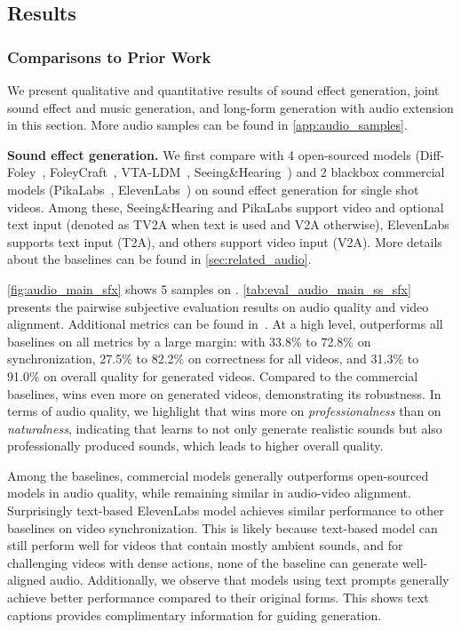 \subsection{Results}

\subsubsection{Comparisons to Prior Work}
\label{sec:main_res}

We present qualitative and quantitative results of sound effect generation, joint sound effect and music generation, and long-form generation with audio extension in this section.
More audio samples can be found in \cref{app:audio_samples}.


\noindent\textbf{Sound effect generation.}
We first compare \OursAudio with 4 open-sourced models (Diff-Foley~\citep{luo2024diff}, FoleyCraft~\citep{zhang2024foleycrafter}, VTA-LDM~\citep{xu2024video}, Seeing\&Hearing~\citep{xing2024seeing}) and 2 blackbox commercial models (PikaLabs~\citep{pikalabs}, ElevenLabs~\citep{elevenlabs}) on sound effect generation for single shot videos.
Among these, Seeing\&Hearing and PikaLabs support video and optional text input (denoted as TV2A when text is used and V2A otherwise), ElevenLabs supports text input (T2A), and others support video input (V2A). More details about the baselines can be found in \cref{sec:related_audio}.



\cref{fig:audio_main_sfx} shows 5 samples on \OursAudioBench. \cref{tab:eval_audio_main_ss_sfx} presents the pairwise subjective evaluation results on audio quality and video alignment. Additional metrics can be found in~.
At a high level, \OursAudio outperforms all baselines on all metrics by a large margin: with 33.8\% to 72.8\% on synchronization, 27.5\% to 82.2\% on correctness for all videos, and 31.3\% to 91.0\% on overall quality for generated videos.
Compared to the commercial baselines, \OursAudio wins even more on generated videos, demonstrating its robustness.
In terms of audio quality, we highlight that \OursAudio wins more on \textit{professionalness} than on \textit{naturalness}, indicating that \OursAudio learns to not only generate realistic sounds but also professionally produced sounds, which leads to higher overall quality.

Among the baselines, commercial models generally outperforms open-sourced models in audio quality, while remaining similar in audio-video alignment.
Surprisingly text-based ElevenLabs model achieves similar performance to other baselines on video synchronization.
This is likely because text-based model can still perform well for videos that contain mostly ambient sounds, and for challenging videos with dense actions, none of the baseline can generate well-aligned audio.
Additionally, we observe that models using text prompts generally achieve better performance compared to their original forms.
This shows text captions provides complimentary information for guiding generation.


